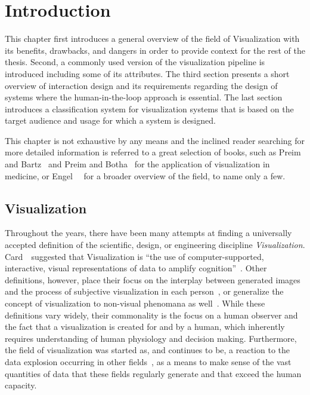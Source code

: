 \chapter{Introduction} \label{cha:intro}
This chapter first introduces a general overview of the field of Visualization with its benefits, drawbacks, and dangers in order to provide context for the rest of the thesis.  Second, a commonly used version of the visualization pipeline is introduced including some of its attributes.  The third section presents a short overview of interaction design and its requirements regarding the design of systems where the human-in-the-loop approach is essential.  The last section introduces a classification system for visualization systems that is based on the target audience and usage for which a system is designed.

This chapter is not exhaustive by any means and the inclined reader searching for more detailed information is referred to a great selection of books, such as Preim and Bartz~\cite{preim2007visualization} and Preim and Botha~\cite{preim2013visual} for the application of visualization in medicine, or Engel~\etal~\cite{engel2006real} for a broader overview of the field, to name only a few.

\section{Visualization} \label{cha:intro:vis}
Throughout the years, there have been many attempts at finding a universally accepted definition of the scientific, design, or engineering discipline \emph{Visualization}.  Card~\etal~suggested that Visualization is ``the use of computer-supported, interactive, visual representations of data to amplify cognition''~\cite{card1999readings}.  Other definitions, however, place their focus on the interplay between generated images and the process of subjective visualization in each person~\cite{van2006views}, or generalize the concept of visualization to non-visual phenomana as well~\cite{ronnberg2016interactive}.  While these definitions vary widely, their commonality is the focus on a human observer and the fact that a visualization is created for and by a human, which inherently requires understanding of human physiology and decision making.  Furthermore, the field of visualization was started as, and continues to be, a reaction to the data explosion occurring in other fields~\cite{lorensen2004death}, as a means to make sense of the vast quantities of data that these fields regularly generate and that exceed the human capacity.

